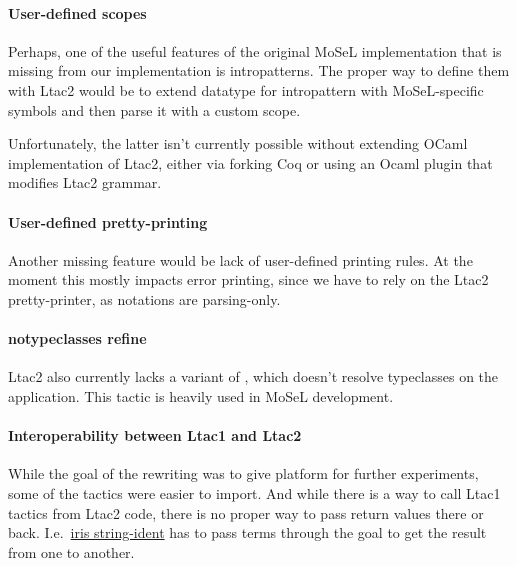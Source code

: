 \paragraph{User-defined scopes}

Perhaps, one of the useful features of the original MoSeL implementation that is missing from our implementation is intropatterns.
The proper way to define them with Ltac2 would be to extend datatype for intropattern with MoSeL-specific symbols and then parse it with a custom scope.

Unfortunately, the latter isn't currently possible without extending OCaml implementation of Ltac2, either via forking Coq or using an Ocaml plugin that modifies Ltac2 grammar.

\paragraph{User-defined pretty-printing}
Another missing feature would be lack of user-defined printing rules.
At the moment this mostly impacts error printing, since we have to rely on the Ltac2 pretty-printer, as notations are parsing-only.

\paragraph{notypeclasses refine}

Ltac2 also currently lacks a variant of , which doesn't resolve typeclasses on the application.
This tactic is heavily used in MoSeL development.

\paragraph{Interoperability between Ltac1 and Ltac2}

While the goal of the rewriting was to give platform for further experiments, some of the tactics were easier to import.
And while there is a way to call Ltac1 tactics from Ltac2 code, there is no proper way to pass return values there or back.
I.e.\ \href{https://gitlab.mpi-sws.org/iris/string-ident/}{iris string-ident} has to pass terms through the goal to get the result from one to another.

